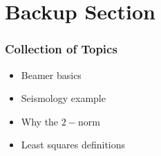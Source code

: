 % 

\section{Backup Section}
\begin{frame}\frametitle{Collection of Topics}
	\begin{itemize}
		\item Beamer basics
		\item Seismology example
		\item Why the $2-$norm
		\item Least squares definitions
	\end{itemize}	
\end{frame}

	
	
	
	

\endinput  %
